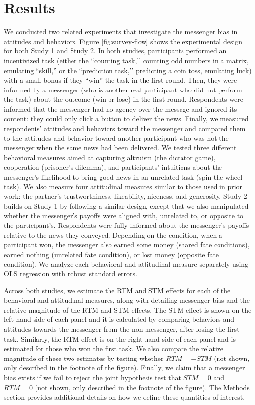 \section{Results}



We conducted two related experiments that investigate the messenger bias
in attitudes and behaviors. Figure \ref{fig:survey-flow} shows the experimental design for
both Study 1 and Study 2. In both studies, participants performed an
incentivized task (either the ``counting task,’’ counting odd numbers in a matrix, emulating ``skill,'' or the ``prediction task,’’ predicting a coin toss, emulating luck) with a
small bonus if they ``win'' the task in the first round. Then, they
were informed by a messenger (who is another real participant who did
not perform the task) about the outcome (win or lose) in the first
round. Respondents were informed that the messenger had no agency over the
message and ignored its content: they could only click a button to
deliver the news. Finally, we measured respondents' attitudes and
behaviors toward the messenger and compared them to the attitudes and
behavior toward another participant who was not the messenger when the
same news had been delivered. We tested three different behavioral
measures aimed at capturing altruism (the dictator game), cooperation
(prisoner's dilemma), and participants' intuitions about the messenger's
likelihood to bring good news in an unrelated task (spin the wheel
task). We also measure four attitudinal measures similar to those used
in prior work: the partner's trustworthiness, likeability, niceness, and
generosity. Study 2 builds on Study 1 by following a similar design,
except that we also manipulated whether the messenger's payoffs were
aligned with, unrelated to, or opposite to the participant's. Respondents
were fully informed about the messenger's payoffs relative to the news
they conveyed. Depending on the condition, when a participant won, the
messenger also earned some money (shared fate conditions), earned
nothing (unrelated fate condition), or lost money (opposite fate
condition). We analyze each behavioral and attitudinal measure
separately using OLS regression with robust standard errors.

Across both studies, we estimate the RTM and STM effects for each of the behavioral and attitudinal
measures, along with detailing messenger bias and the relative magnitude
of the RTM and STM effects. The STM effect is shown on the left-hand side of each panel and it is calculated by comparing behaviors and attitudes towards the messenger from the non-messenger, after losing the first task. 
Similarly, the RTM effect is on the right-hand side of each panel and is estimated for those who won the first task.
We also compare the relative magnitude of these two estimates by testing
whether $RTM = -STM$ (not shown, only described in the footnote of
the figure). Finally, we claim that a messenger bias exists if we fail to
reject the joint hypothesis test that $STM = 0$ and $RTM = 0$ (not
shown, only described in the footnote of the figure). The Methods section
provides additional details on how we define these quantities of
interest.

